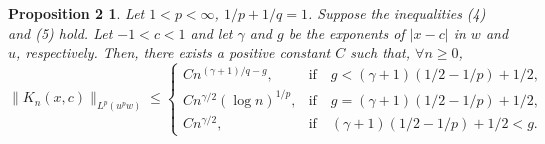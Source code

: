 \documentclass[a4paper,12pt]{article}
\theoremstyle{plain}
\newtheorem*{propTwo}{Proposition 2}
\theoremstyle{definition}
\begin{document}
\begin{propTwo}
Let $1 < p < \infty$, $1/p + 1/q = 1$.
Suppose the inequalities (4) and (5) hold. Let $-1 < c < 1$
and let $\gamma$ and $g$ be the exponents of $| x - c |$
in $w$ and $u$, respectively. Then, there exists a positive constant
$C$ such that, $\forall n \geq 0$,
$$
\| K_{n}(x,c) \|_{L^{p}(u^{p}w)}
\leq
\begin{cases}
C n^{(\gamma+1)/q - g}, &\text{if}\quad g < (\gamma +1) (1/2 - 1/p) + 1/2,\\
C n^{\gamma/2} (\log n)^{1/p}, &\text{if}\quad g = (\gamma +1) (1/2 - 1/p) + 1/2,\\
C n^{\gamma/2}, &\text{if}\quad (\gamma +1) (1/2 - 1/p) + 1/2 < g.
\end{cases}
$$
\end{propTwo}
\end{document}
